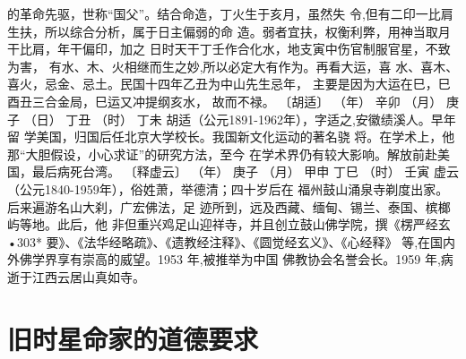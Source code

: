 的革命先驱，世称“国父”。结合命造，丁火生于亥月，虽然失
令,但有二印一比肩生扶，所以综合分析，属于日主偏弱的命
造。弱者宜扶，权衡利弊，用神当取月干比肩，年干偏印，加之
日时天干丁壬作合化水，地支寅中伤官制服官星，不致为害，
有水、木、火相继而生之妙,所以必定大有作为。再看大运，喜
水、喜木、喜火，忌金、忌土。民国十四年乙丑为中山先生忌年，
主要是因为大运在巳，巳酉丑三合金局，巳运又冲提纲亥水，
故而不禄。
〔胡适〕
（年） 辛卯
（月） 庚子
（日） 丁丑
（时） 丁未
胡适（公元1891-1962年），字适之,安徽绩溪人。早年留
学美国，归国后任北京大学校长。我国新文化运动的著名骁
将。在学术上，他那“大胆假设，小心求证”的研究方法，至今
在学术界仍有较大影响。解放前赴美国，最后病死台湾。
〔释虚云〕
（年） 庚子
（月） 甲申
丁巳
（时） 壬寅
虚云（公元1840-1959年），俗姓萧，举德清；四十岁后在
福州鼓山涌泉寺剃度出家。后来遍游名山大刹，广宏佛法，足
迹所到，远及西藏、缅甸、锡兰、泰国、槟榔屿等地。此后，他
非但重兴鸡足山迎祥寺，并且创立鼓山佛学院，撰《楞严经玄
•303*
要》、《法华经略疏》、《遗教经注释》、《圆觉经玄义》、《心经释》
等,在国内外佛学界享有崇高的威望。1953 年,被推举为中国
佛教协会名誉会长。1959 年,病逝于江西云居山真如寺。

\section{旧时星命家的道德要求}

